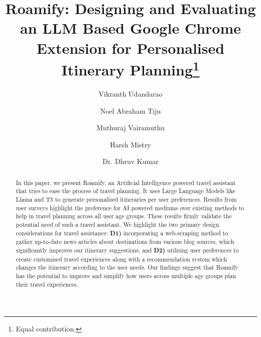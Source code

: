 \documentclass[final,3p,times,authoryear]{elsarticle}
\begin{document}
\begin{frontmatter}



\title{Roamify: Designing and Evaluating an LLM Based Google Chrome Extension for Personalised Itinerary Planning\thanks{Equal contribution.}}

\author{Vikranth Udandarao}
\author{Noel Abraham Tiju}
\author{Muthuraj Vairamuthu}
\author{Harsh Mistry}
\author{Dr. Dhruv Kumar}




\begin{abstract}
    In this paper, we present Roamify, an Artificial Intelligence powered travel assistant that tries to ease the process of travel planning. It uses Large Language Models like Llama and T5 to generate personalised itineraries per user preferences. Results from user surveys highlight the preference for AI powered mediums over existing methods to help in travel planning across all user age groups. These results firmly validate the potential need of such a travel assistant. We highlight the two primary design considerations for travel assistance: \textbf{D1)} incorporating a web-scraping method to gather up-to-date news articles about  destinations from various blog sources, which significantly improves our itinerary suggestions, and \textbf{D2)} utilising user preferences to create customised travel experiences along with a recommendation system which changes the itinerary according to the user needs. Our findings suggest that Roamify has the potential to improve and simplify how users across multiple age groups plan their travel experiences.
\end{abstract}


\end{frontmatter}
\end{document}
